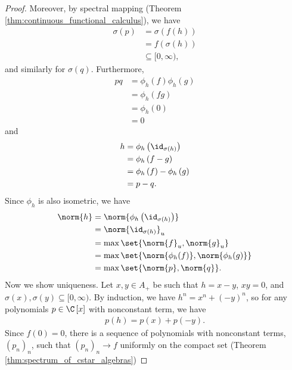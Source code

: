 \begin{proof}
  Moreover, by spectral mapping (Theorem \ref{thm:continuous_functional_calculus}), we have
  \begin{align*}
    \sigma\left( p \right) &= \sigma\left( f\left( h \right) \right)\\
                           &= f\left( \sigma\left( h \right) \right)\\
                           &\subseteq [0,\infty),
  \end{align*}
  and similarly for $\sigma\left( q \right)$. Furthermore,
  \begin{align*}
    pq &= \phi_h\left( f \right)\phi_h\left( g \right)\\
       &= \phi_h\left( fg \right)\\
       &= \phi_h\left( 0 \right)\\
       &= 0
  \end{align*}
  and
  \begin{align*}
    h &= \phi_h\left( \id_{\sigma\left( h \right)} \right)\\
      &= \phi_h\left( f-g \right)\\
      &= \phi_h\left( f \right)-\phi_h\left( g \right)\\
      &= p-q.
  \end{align*}
  Since $\phi_h$ is also isometric, we have
  \begin{align*}
    \norm{h} &= \norm{\phi_h\left( \id_{\sigma\left( h \right)} \right)}\\
             &= \norm{\id_{\sigma\left( h \right)}}_{u}\\
             &= \max\set{\norm{f}_{u},\norm{g}_{u}}\\
             &= \max\set{\norm{\phi_h(f)},\norm{\phi_h(g)}}\\
             &= \max\set{\norm{p},\norm{q}}.
  \end{align*}
  Now we show uniqueness. Let $x,y\in A_{+}$ be such that $h = x-y$, $xy = 0$, and $\sigma\left( x \right),\sigma\left( y \right)\subseteq [0,\infty)$. By induction, we have $h^n = x^n + \left( -y \right)^n$, so for any polynomials $p\in \C\left[ x \right]$ with nonconstant term, we have
  \begin{align*}
    p\left( h \right) = p\left( x \right) + p\left( -y \right).
  \end{align*}
  Since $f(0) = 0$, there is a sequence of polynomials with nonconstant terms, $\left( p_n \right)_n$, such that $\left( p_n \right)_n\rightarrow f$ uniformly on the compact set (Theorem \ref{thm:spectrum_of_cstar_algebras})

\end{proof}

